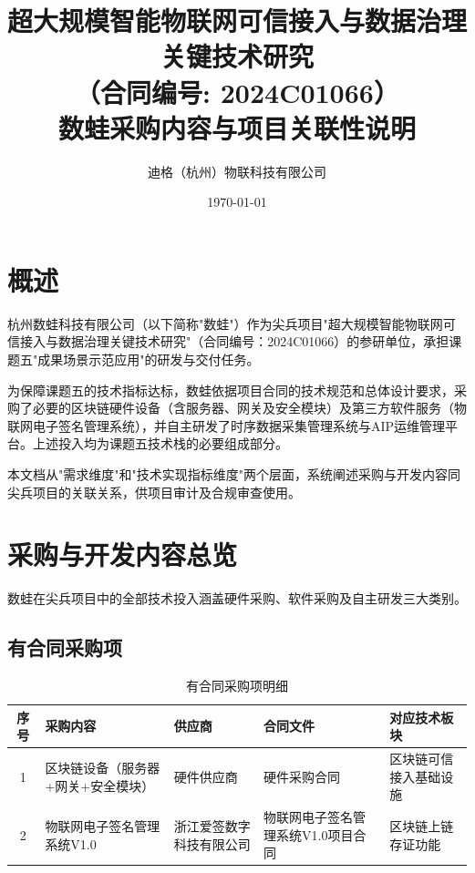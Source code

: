 \documentclass[12pt,a4paper]{ctexart}
\title{{\heiti\zihao{2} 超大规模智能物联网可信接入与数据治理关键技术研究 \\[6pt]}
       {\kaishu\large （合同编号: 2024C01066）} \\[12pt]
       {\heiti\zihao{3} 数蛙采购内容与项目关联性说明}}
\author{迪格（杭州）物联科技有限公司}
\date{\today}
\begin{document}
\maketitle
\thispagestyle{empty}
\newpage

\tableofcontents
\newpage

\section{概述}

杭州数蛙科技有限公司（以下简称"数蛙"）作为尖兵项目"超大规模智能物联网可信接入与数据治理关键技术研究"（合同编号：2024C01066）的参研单位，承担课题五"成果场景示范应用"的研发与交付任务。

为保障课题五的技术指标达标，数蛙依据项目合同的技术规范和总体设计要求，采购了必要的区块链硬件设备（含服务器、网关及安全模块）及第三方软件服务（物联网电子签名管理系统），并自主研发了时序数据采集管理系统与AIP运维管理平台。上述投入均为课题五技术栈的必要组成部分。

本文档从"需求维度"和"技术实现指标维度"两个层面，系统阐述采购与开发内容同尖兵项目的关联关系，供项目审计及合规审查使用。

\section{采购与开发内容总览}

数蛙在尖兵项目中的全部技术投入涵盖硬件采购、软件采购及自主研发三大类别。

\subsection{有合同采购项}

\begin{table}[H]
\centering
\caption{有合同采购项明细}
\begin{tabular}{@{}cllll@{}}
\toprule
\textbf{序号} & \textbf{采购内容} & \textbf{供应商} & \textbf{合同文件} & \textbf{对应技术板块} \\
\midrule
1 & 区块链设备（服务器+网关+安全模块） & 硬件供应商 & 硬件采购合同 & 区块链可信接入基础设施 \\
2 & 物联网电子签名管理系统V1.0 & 浙江爱签数字科技有限公司 & 物联网电子签名管理系统V1.0项目合同 & 区块链上链存证功能 \\
\bottomrule
\end{tabular}
\end{table}
\end{document}
